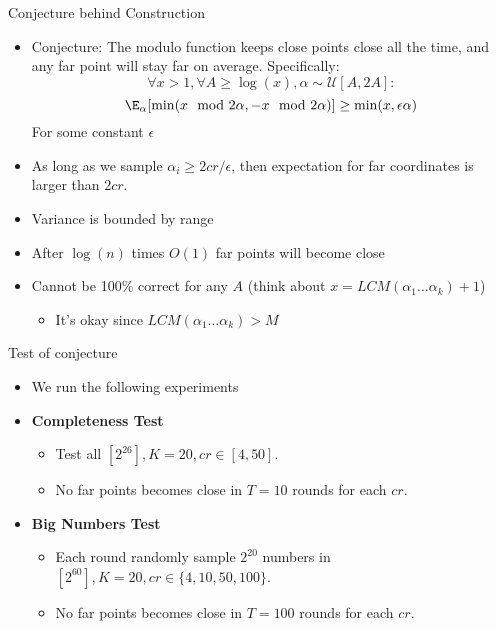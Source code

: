 \documentclass[xcolor=svgnames]{beamer}
\begin{document}
\begin{frame}{Conjecture behind Construction}
\begin{itemize}
\item Conjecture: The modulo function keeps close points close all the time, and any far point will stay far on average. Specifically:
$$\forall x > 1, \forall A \geq \log(x), \alpha\sim\mathcal{U}[A,2A] : $$
$$\E_\alpha[\min(x \mod {2\alpha},-x \mod {2\alpha}) ] \geq \min(x,\epsilon\alpha)$$
For some constant $\epsilon$
\item As long as we sample $\alpha_i \geq 2cr/\epsilon$, then expectation for far coordinates is larger than $2cr$.
\item Variance is bounded by range
\item After $\log(n)$ times $O(1)$ far points will become close
\item Cannot be 100\% correct for any $A$ (think about $x=LCM(\alpha_1 \ldots \alpha_k) + 1$)
\begin{itemize}
\item It's okay since $LCM(\alpha_1 \ldots \alpha_k) > M$
\end{itemize}
\end{itemize}
\end{frame}

\begin{frame}{Test of conjecture}
\begin{itemize}
\item We run the following experiments
\item \textbf{Completeness Test}
\begin{itemize}
\item Test all $[2^{26}], K=20, cr \in [4, 50]$.
\item No far points becomes close in $T=10$ rounds for each $cr$.
\end{itemize}
\item \textbf{Big Numbers Test}
\begin{itemize}
\item Each round randomly sample $2^{20}$ numbers in $[2^{60}], K=20, cr \in \{4, 10, 50, 100\}$.
\item No far points becomes close in $T=100$ rounds for each $cr$.
\end{itemize}
\end{itemize}
\end{frame}
\end{document}

